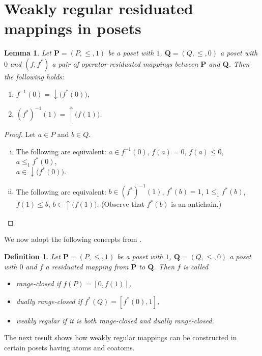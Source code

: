 \documentclass[12pt]{article}
\newtheorem{definition}[theorem]{Definition}
\newtheorem{lemma}[theorem]{Lemma}
\begin{document}
\section{Weakly regular residuated mappings in posets}

\begin{lemma}\label{lem5}
Let $\mathbf P=(P,\le,1)$ be a poset with $1$, $\mathbf Q=(Q,\le,0)$ a poset with $0$ and $(f,f^*)$ a pair of operator-residuated mappings between $\mathbf P$ and $\mathbf Q$. Then the following holds:
\begin{enumerate}[{\rm(i)}]
\item $f^{-1}(0)=\downarrow\big(f^*(0)\big)$,
\item $(f^*)^{-1}(1)=\uparrow\big(f(1)\big)$.
\end{enumerate}	
\end{lemma}

\begin{proof}
Let $a\in P$ and $b\in Q$.
\begin{enumerate}[(i)]
\item The following are equivalent: $a\in f^{-1}(0)$, $f(a)=0$, $f(a)\le0$, $a\le_1f^*(0)$, \\ $a\in\downarrow\big(f^*(0)\big)$.
\item The following are equivalent: $b\in(f^*)^{-1}(1)$, $f^*(b)=1$, $1\le_1f^*(b)$, $f(1)\le b$, $b\in\uparrow\big(f(1)\big)$. (Observe that $f^*(b)$ is an antichain.)
\end{enumerate}
\end{proof}

We now adopt the following concepts from \cite{RV}.

\begin{definition}
Let $\mathbf P=(P,\le,1)$ be a poset with $1$, $\mathbf Q=(Q,\le,0)$ a poset with $0$ and $f$ a residuated mapping from $\mathbf P$ to $\mathbf Q$. Then $f$ is called
\begin{itemize}
\item {\em range-closed} if $f(P)=[0,f(1)]$,
\item {\em dually range-closed} if $f^*(Q)=[f^*(0),1]$,
\item {\em weakly regular} if it is both range-closed and dually range-closed.
\end{itemize}	
\end{definition}

The next result shows how weakly regular mappings can be constructed in certain posets having atoms and coatoms.
\end{document}
